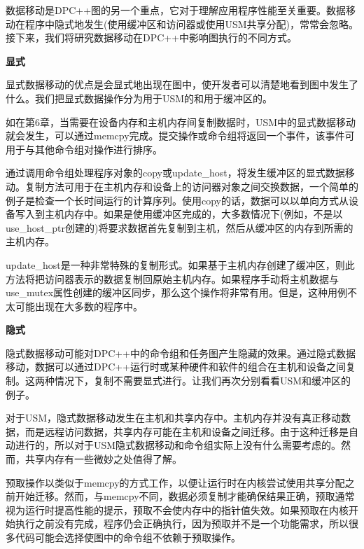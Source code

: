 数据移动是DPC++图的另一个重点，它对于理解应用程序性能至关重要。数据移动在程序中隐式地发生(使用缓冲区和访问器或使用USM共享分配)，常常会忽略。接下来，我们将研究数据移动在DPC++中影响图执行的不同方式。\par

\hspace*{\fill} \par %
\textbf{显式}

显式数据移动的优点是会显式地出现在图中，使开发者可以清楚地看到图中发生了什么。我们把显式数据操作分为用于USM的和用于缓冲区的。\par

如在第6章，当需要在设备内存和主机内存间复制数据时，USM中的显式数据移动就会发生，可以通过memcpy完成。提交操作或命令组将返回一个事件，该事件可用于与其他命令组对操作进行排序。\par

通过调用命令组处理程序对象的copy或update\_host，将发生缓冲区的显式数据移动。复制方法可用于在主机内存和设备上的访问器对象之间交换数据，一个简单的例子是检查一个长时间运行的计算序列。使用copy的话，数据可以以单向方式从设备写入到主机内存中。如果是使用缓冲区完成的，大多数情况下(例如，不是以use\_host\_ptr创建的)将要求数据首先复制到主机，然后从缓冲区的内存到所需的主机内存。\par

update\_host是一种非常特殊的复制形式。如果基于主机内存创建了缓冲区，则此方法将把访问器表示的数据复制回原始主机内存。如果程序手动将主机数据与use\_mutex属性创建的缓冲区同步，那么这个操作将非常有用。但是，这种用例不太可能出现在大多数的程序中。\par

\hspace*{\fill} \par %
\textbf{隐式}

隐式数据移动可能对DPC++中的命令组和任务图产生隐藏的效果。通过隐式数据移动，数据可以通过DPC++运行时或某种硬件和软件的组合在主机和设备之间复制。这两种情况下，复制不需要显式进行。让我们再次分别看看USM和缓冲区的例子。\par

对于USM，隐式数据移动发生在主机和共享内存中。主机内存并没有真正移动数据，而是远程访问数据，共享内存可能在主机和设备之间迁移。由于这种迁移是自动进行的，所以对于USM隐式数据移动和命令组实际上没有什么需要考虑的。然而，共享内存有一些微妙之处值得了解。\par

预取操作以类似于memcpy的方式工作，以便让运行时在内核尝试使用共享分配之前开始迁移。然而，与memcpy不同，数据必须复制才能确保结果正确，预取通常视为运行时提高性能的提示，预取不会使内存中的指针值失效。如果预取在内核开始执行之前没有完成，程序仍会正确执行，因为预取并不是一个功能需求，所以很多代码可能会选择使图中的命令组不依赖于预取操作。\par

